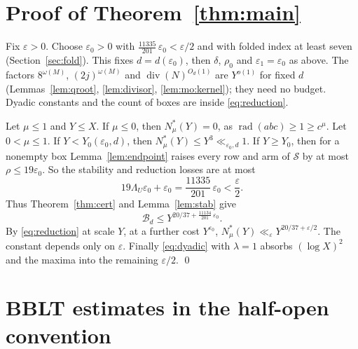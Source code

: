 \documentclass{amsart}
\theoremstyle{definition}
\theoremstyle{plain}
\numberwithin{equation}{section}
\numberwithin{table}{section}
\newcommand{\rad}{\operatorname{rad}}
\newcommand{\certLambdaNineteen}{\frac{11134}{201}}
\newcommand{\certBudget}{\frac{11335}{201}}
\begin{document}
\section{Proof of Theorem~\ref{thm:main}}\label{sec:proof}

Fix $\varepsilon>0$. Choose $\varepsilon_0>0$ with
$\certBudget\,\varepsilon_0<\varepsilon/2$ and with folded index at least
seven (Section~\ref{sec:fold}). This fixes $d=d(\varepsilon_0)$, then
$\delta$, $\rho_0$ and $\varepsilon_1=\varepsilon_0$ as above. The factors
$8^{\omega(M)}$, $(2j)^{\omega(M)}$ and $\operatorname{div}(N)^{O_d(1)}$ are
$Y^{o(1)}$ for fixed $d$ (Lemmas~\ref{lem:qroot}, \ref{lem:divisor},
\ref{lem:mo:kernel}); they need no budget. Dyadic constants and the count of
boxes are inside \eqref{eq:reduction}.

Let $\mu\le1$ and $Y\le X$. If $\mu\le0$, then $N^*_\mu(Y)=0$, as
$\rad(abc)\ge1\ge c^\mu$. Let $0<\mu\le1$. If $Y<Y_0(\varepsilon_0,d)$, then
$N^*_\mu(Y)\le Y^3\ll_{\varepsilon_0,d}1$. If $Y\ge Y_0$, then for a nonempty
box Lemma~\ref{lem:endpoint} raises every row and arm of $\mathcal S$ by at
most $\rho\le19\varepsilon_0$. So the stability and reduction losses are at
most
\[
 19\Lambda_U\varepsilon_0+\varepsilon_0
 =\certBudget\,\varepsilon_0
 <\frac\varepsilon2.
\]
Thus Theorem~\ref{thm:cert} and Lemma~\ref{lem:stab} give
\begin{equation}\label{eq:boxbound}
 \mathcal B_d\le Y^{20/37+\certLambdaNineteen\,\varepsilon_0} .
\end{equation}
By \eqref{eq:reduction} at scale $Y$, at a further cost $Y^{\varepsilon_0}$,
$N^*_\mu(Y)\ll_\varepsilon Y^{20/37+\varepsilon/2}$. The constant depends
only on $\varepsilon$. Finally \eqref{eq:dyadic} with $\lambda=1$ absorbs
$(\log X)^2$ and the maxima into the remaining $\varepsilon/2$.
\qed

\appendix

\section{BBLT estimates in the half-open convention}\label{app:windows}
\end{document}
